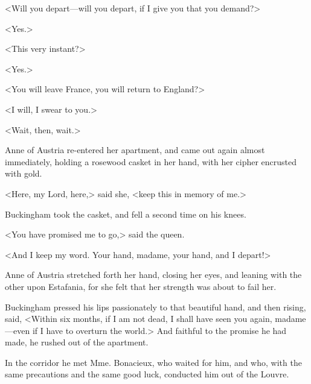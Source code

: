 <Will you depart---will you depart, if I give you that you demand?> 

<Yes.> 

<This very instant?> 

<Yes.> 

<You will leave France, you will return to England?> 

<I will, I swear to you.> 

<Wait, then, wait.> 

Anne of Austria re-entered her apartment, and came out again almost immediately, holding a rosewood casket in her hand, with her cipher encrusted with gold. 

<Here, my Lord, here,> said she, <keep this in memory of me.> 

Buckingham took the casket, and fell a second time on his knees. 

<You have promised me to go,> said the queen. 

<And I keep my word. Your hand, madame, your hand, and I depart!> 

Anne of Austria stretched forth her hand, closing her eyes, and leaning with the other upon Estafania, for she felt that her strength was about to fail her. 

Buckingham pressed his lips passionately to that beautiful hand, and then rising, said, <Within six months, if I am not dead, I shall have seen you again, madame---even if I have to overturn the world.> And faithful to the promise he had made, he rushed out of the apartment. 

In the corridor he met Mme. Bonacieux, who waited for him, and who, with the same precautions and the same good luck, conducted him out of the Louvre.